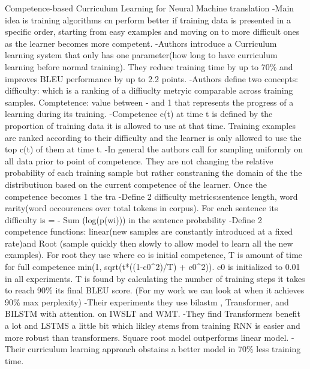 Competence-based Curriculum Learning for Neural Machine translation
-Main idea is training algorithms cn perform better if training data is presented in a specific order, starting from easy examples and moving on to more difficult ones as the learner becomes more competent. 
-Authors introduce a Curriculum learning system that only has one parameter(how long to have curriculum learning before normal training). They reduce training time by up to 70\% and improves BLEU performance by up to 2.2 points. 
-Authors define two concepts: difficulty: which is a ranking of a diffiuclty metryic comparable across training samples. Comptetence: value between - and 1 that represents the progress of a learning during its training. 
-Competence c(t) at time t is defined by the proportion of training data it is allowed to use at that time. Training examples are ranked according to their difficulty and the learner is only allowed to use the top c(t) of them at time t. 
-In general the authors call for sampling uniformly on all data prior to point of competence. They are not changing the relative probability of each training sample but rather constraning the domain of the the distributiuon based on the current competence of the learner. Once the competence becomes 1 the tra
-Define 2 difficulty metrics:sentence length, word rarity(word occourences over total tokens in corpus). For each sentence its difficulty is = - Sum (log(p(wi))) in the sentence probability
-Define 2 competence functions: linear(new samples are constantly introduced at a fixed rate)and Root (sample quickly then slowly to allow model to learn all the new examples). For root they use where co is initial competence, T is amount of time for full competence min(1, sqrt(t*((1-c0^2)/T) + c0^2)). c0 is initialized to 0.01 in all experiments. T is found by calculating the number of training steps it takes to reach 90\% its final BLEU score. (For my work we can look at when it achieves 90\% max perplexity)
-Their experiments they use bilastm , Transformer, and BILSTM with attention.  on IWSLT and WMT. 
-They find Transformers benefit a lot and LSTMS  a little bit which likley stems from training RNN is easier and more robust than transformers. Square root model outperforms linear model. 
-Their curriculum learning approach obstains a better model in 70\% less training time. 

